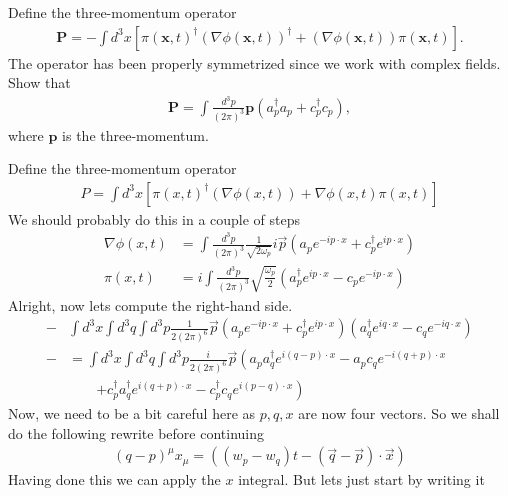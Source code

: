 \documentclass[working, oneside]{../../Preambles/tuftebook}
\begin{document}
\begin{exercise}[10]
Define the three-momentum operator
\begin{align*}
    \mathbf{P} = -\int d^3x \left[ \pi(\mathbf{x}, t)^\dagger \left( \nabla \phi(\mathbf{x}, t) \right)^\dagger + \left( \nabla \phi(\mathbf{x}, t) \right) \pi(\mathbf{x}, t) \right]. \tag{39}
\end{align*}
The operator has been properly symmetrized since we work with complex fields. Show that
\begin{align*}
    \mathbf{P} = \int \frac{d^3p}{(2\pi)^3} \mathbf{p} \left( a_p^\dagger a_p + c_p^\dagger c_p \right), \tag{40}
\end{align*}
where \( \mathbf{p} \) is the three-momentum.
\end{exercise}
\begin{solution}
Define the three-momentum operator
\begin{align*}
P = \int d^3x \left[ \pi(x,t)^\dagger (\nabla \phi(x,t)) + \nabla \phi(x,t) \pi(x,t) \right]
\end{align*}
We should probably do this in a couple of steps
\begin{align*}
\nabla \phi(x,t) &= \int \frac{d^3p}{(2\pi)^3} \frac{1}{\sqrt{2\omega_p}} i \vec{p} \left( a_p e^{-i p \cdot x} + c_p^\dagger e^{i p \cdot x} \right) \\
\pi(x,t) &= i \int \frac{d^3p}{(2\pi)^3} \sqrt{\frac{\omega_p}{2}} \left( a_p^\dagger e^{i p \cdot x} - c_p e^{-i p \cdot x} \right)
\end{align*}
Alright, now lets compute the right-hand side.
\begin{align*}
-&\int d^3x \int d^3q \int d^3p \frac{1}{2(2\pi)^6} \vec{p} \left( a_p e^{-i p \cdot x} + c_p^\dagger e^{i p \cdot x} \right) \left( a_q^\dagger e^{i q \cdot x} - c_q e^{-i q \cdot x} \right) \\
-&= \int d^3x \int d^3q \int d^3p \frac{i}{2(2\pi)^6} \vec{p} \left( a_p a_q^\dagger e^{i(q-p) \cdot x} - a_p c_q e^{-i(q+p) \cdot x} \right. \\
&\qquad \left. + c_p^\dagger a_q^\dagger e^{i(q+p) \cdot x} - c_p^\dagger c_q e^{i(p-q) \cdot x} \right)
\end{align*}
Now, we need to be a bit careful here as $p, q, x$ are now four vectors. So we shall do the following rewrite before continuing
\begin{align*}
(q-p)^\mu x_\mu = ((w_p - w_q)t - (\vec{q} - \vec{p}) \cdot \vec{x})
\end{align*}
Having done this we can apply the $x$ integral. But lets just start by writing it

\end{solution}
\end{document}
